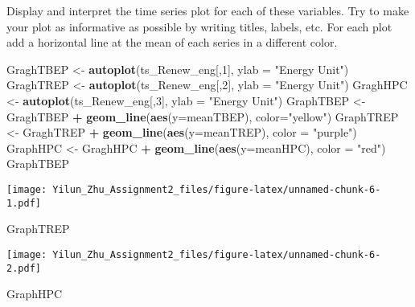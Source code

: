 \documentclass[
]{article}
\newenvironment{Shaded}{\begin{snugshade}}{\end{snugshade}}
\newcommand{\AttributeTok}[1]{\textcolor[rgb]{0.13,0.29,0.53}{#1}}
\newcommand{\DecValTok}[1]{\textcolor[rgb]{0.00,0.00,0.81}{#1}}
\newcommand{\FunctionTok}[1]{\textcolor[rgb]{0.13,0.29,0.53}{\textbf{#1}}}
\newcommand{\NormalTok}[1]{#1}
\newcommand{\OtherTok}[1]{\textcolor[rgb]{0.56,0.35,0.01}{#1}}
\newcommand{\SpecialCharTok}[1]{\textcolor[rgb]{0.81,0.36,0.00}{\textbf{#1}}}
\newcommand{\StringTok}[1]{\textcolor[rgb]{0.31,0.60,0.02}{#1}}
\begin{document}
Display and interpret the time series plot for each of these variables.
Try to make your plot as informative as possible by writing titles,
labels, etc. For each plot add a horizontal line at the mean of each
series in a different color.

\begin{Shaded}
\begin{Highlighting}[]
\NormalTok{GraghTBEP }\OtherTok{\textless{}{-}} \FunctionTok{autoplot}\NormalTok{(ts\_Renew\_eng[,}\DecValTok{1}\NormalTok{], }\AttributeTok{ylab =} \StringTok{"Energy Unit"}\NormalTok{)}
\NormalTok{GraghTREP }\OtherTok{\textless{}{-}} \FunctionTok{autoplot}\NormalTok{(ts\_Renew\_eng[,}\DecValTok{2}\NormalTok{], }\AttributeTok{ylab =} \StringTok{"Energy Unit"}\NormalTok{)}
\NormalTok{GraghHPC }\OtherTok{\textless{}{-}} \FunctionTok{autoplot}\NormalTok{(ts\_Renew\_eng[,}\DecValTok{3}\NormalTok{], }\AttributeTok{ylab =} \StringTok{"Energy Unit"}\NormalTok{)}
\NormalTok{GraphTBEP }\OtherTok{\textless{}{-}}\NormalTok{ GraghTBEP }\SpecialCharTok{+} \FunctionTok{geom\_line}\NormalTok{(}\FunctionTok{aes}\NormalTok{(}\AttributeTok{y=}\NormalTok{meanTBEP), }\AttributeTok{color=}\StringTok{"yellow"}\NormalTok{)}
\NormalTok{GraphTREP }\OtherTok{\textless{}{-}}\NormalTok{ GraghTREP }\SpecialCharTok{+} \FunctionTok{geom\_line}\NormalTok{(}\FunctionTok{aes}\NormalTok{(}\AttributeTok{y=}\NormalTok{meanTREP), }\AttributeTok{color =} \StringTok{"purple"}\NormalTok{)}
\NormalTok{GraphHPC }\OtherTok{\textless{}{-}}\NormalTok{ GraghHPC }\SpecialCharTok{+} \FunctionTok{geom\_line}\NormalTok{(}\FunctionTok{aes}\NormalTok{(}\AttributeTok{y=}\NormalTok{meanHPC), }\AttributeTok{color =} \StringTok{"red"}\NormalTok{)}
\NormalTok{GraphTBEP}
\end{Highlighting}
\end{Shaded}

\texttt{[image: Yilun\_Zhu\_Assignment2\_files/figure-latex/unnamed-chunk-6-1.pdf]}

\begin{Shaded}
\begin{Highlighting}[]
\NormalTok{GraphTREP}
\end{Highlighting}
\end{Shaded}

\texttt{[image: Yilun\_Zhu\_Assignment2\_files/figure-latex/unnamed-chunk-6-2.pdf]}

\begin{Shaded}
\begin{Highlighting}[]
\NormalTok{GraphHPC}
\end{Highlighting}
\end{Shaded}
\end{document}
